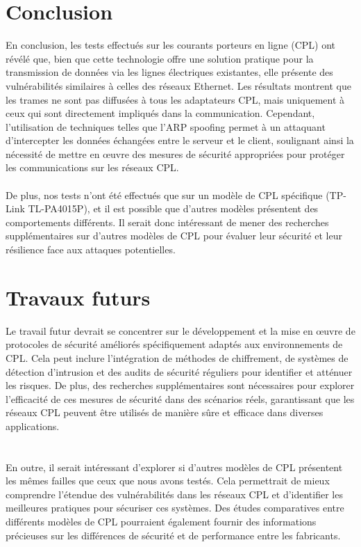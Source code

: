 \documentclass[a4paper,twocolumn]{report}
\begin{document}
\section{Conclusion} En conclusion, les tests effectués sur les courants porteurs 
en ligne (CPL) ont révélé que, bien que cette technologie offre une solution 
pratique pour la transmission de données via les lignes électriques existantes,
elle présente des vulnérabilités similaires à celles des réseaux Ethernet. 
Les résultats montrent que les trames ne sont pas diffusées à tous les adaptateurs CPL,
mais uniquement à ceux qui sont directement impliqués dans la communication. Cependant,
l'utilisation de techniques telles que l'ARP spoofing permet à un attaquant d'intercepter
les données échangées entre le serveur et le client, soulignant ainsi la nécessité de
mettre en œuvre des mesures de sécurité appropriées pour protéger les communications sur les réseaux CPL.
\paragraph{}De plus, nos tests n'ont été effectués que sur un modèle de CPL spécifique 
(TP-Link TL-PA4015P), et il est possible que d'autres modèles présentent des comportements différents.
Il serait donc intéressant de mener des recherches supplémentaires sur d'autres modèles
de CPL pour évaluer leur sécurité et leur résilience face aux attaques potentielles.

\section{Travaux futurs}
Le travail futur devrait se concentrer sur le développement et la mise en œuvre
de protocoles de sécurité améliorés spécifiquement adaptés aux environnements de CPL.
Cela peut inclure l'intégration de méthodes de chiffrement, de systèmes de détection 
d'intrusion et des audits de sécurité réguliers pour identifier et atténuer les risques.
De plus, des recherches supplémentaires sont nécessaires pour explorer l'efficacité de
ces mesures de sécurité dans des scénarios réels, garantissant que les réseaux CPL
peuvent être utilisés de manière sûre et efficace dans diverses applications.
\section{}En outre, il serait intéressant d'explorer si d'autres modèles de CPL 
présentent les mêmes failles que ceux que nous avons testés. Cela permettrait de
mieux comprendre l'étendue des vulnérabilités dans les réseaux CPL et d'identifier
les meilleures pratiques pour sécuriser ces systèmes. Des études comparatives entre
différents modèles de CPL pourraient également fournir des informations précieuses
sur les différences de sécurité et de performance entre les fabricants.
\end{document}
